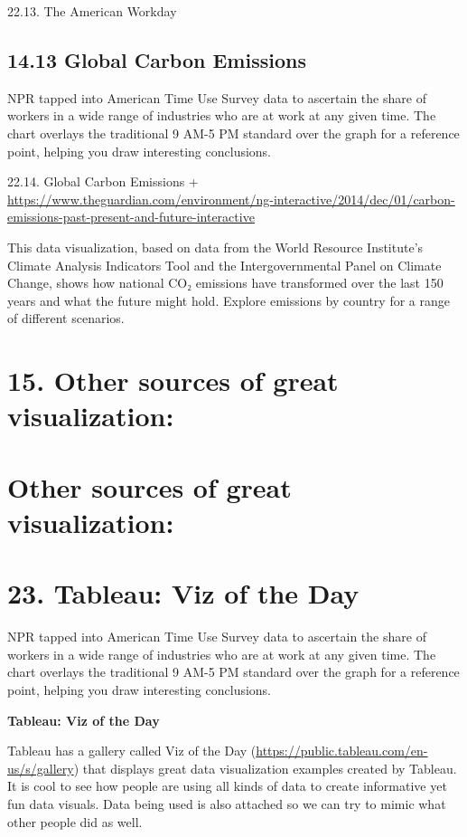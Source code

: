 \documentclass[]{book}
\theoremstyle{definition}
\theoremstyle{definition}
\theoremstyle{definition}
\theoremstyle{remark}
\begin{document}
22.13. The American Workday

\subsection{14.13 Global Carbon
Emissions}\label{global-carbon-emissions}

\citep{CO2_emission}

NPR tapped into American Time Use Survey data to ascertain the share of
workers in a wide range of industries who are at work at any given time.
The chart overlays the traditional 9 AM-5 PM standard over the graph for
a reference point, helping you draw interesting conclusions.

22.14. Global Carbon Emissions +
\url{https://www.theguardian.com/environment/ng-interactive/2014/dec/01/carbon-emissions-past-present-and-future-interactive}

This data visualization, based on data from the World Resource
Institute's Climate Analysis Indicators Tool and the Intergovernmental
Panel on Climate Change, shows how national CO₂ emissions have
transformed over the last 150 years and what the future might hold.
Explore emissions by country for a range of different scenarios.

\section{15. Other sources of great
visualization:}\label{other-sources-of-great-visualization}

\section{Other sources of great
visualization:}\label{other-sources-of-great-visualization-1}

\section{23. Tableau: Viz of the Day}\label{tableau-viz-of-the-day}

NPR tapped into American Time Use Survey data to ascertain the share of
workers in a wide range of industries who are at work at any given time.
The chart overlays the traditional 9 AM-5 PM standard over the graph for
a reference point, helping you draw interesting conclusions.

\textbf{Tableau: Viz of the Day}

Tableau has a gallery called Viz of the Day
(\url{https://public.tableau.com/en-us/s/gallery}) that displays great
data visualization examples created by Tableau. It is cool to see how
people are using all kinds of data to create informative yet fun data
visuals. Data being used is also attached so we can try to mimic what
other people did as well.
\end{document}
